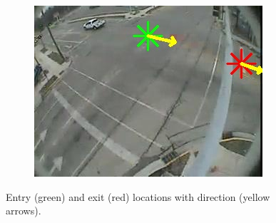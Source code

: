 \begin{figure}
\begin{subfigure}{0.32\linewidth}
            \includegraphics[width=\linewidth]{./img/scene_learning/res/intersection_4/intersection_4-10.jpg}
        \end{subfigure}
        \caption{Entry (green) and exit (red) locations with direction (yellow arrows).}
        \label{fig:entry-exit-app-6}
\end{figure}
